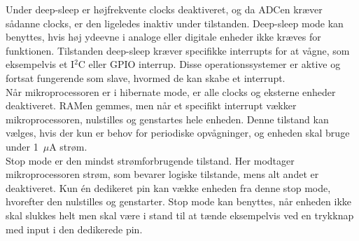 Under deep-sleep er højfrekvente clocks deaktiveret, og da ADCen kræver sådanne clocks, er den ligeledes inaktiv under tilstanden. Deep-sleep mode kan benyttes, hvis høj ydeevne i analoge eller digitale enheder ikke kræves for funktionen. Tilstanden deep-sleep kræver specifikke interrupts for at vågne, som eksempelvis et I$^{2}$C eller GPIO interrup. Disse operationssystemer er aktive og fortsat fungerende som slave, hvormed de kan skabe et interrupt. \citep{Semiconductor2016PowerMode} \\
Når mikroprocessoren er i hibernate mode, er alle clocks og eksterne enheder deaktiveret. RAMen gemmes, men når et specifikt interrupt vækker mikroprocessoren, nulstilles og genstartes hele enheden. Denne tilstand kan vælges, hvis der kun er behov for periodiske opvågninger, og enheden skal bruge under 1~$\mu$A strøm. \citep{Semiconductor2016PowerMode} \\
Stop mode er den mindst strømforbrugende tilstand. Her modtager mikroprocessoren strøm, som bevarer logiske tilstande, mens alt andet er deaktiveret. Kun én dedikeret pin kan vække enheden fra denne stop mode, hvorefter den nulstilles og genstarter. Stop mode kan benyttes, når enheden ikke skal slukkes helt men skal være i stand til at tænde eksempelvis ved en trykknap med input i den dedikerede pin. \citep{Semiconductor2016PowerMode}

